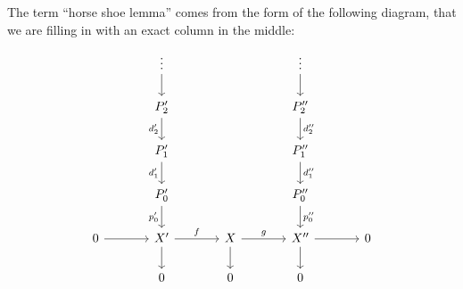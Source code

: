 \begin{remark*}
  The term \enquote{horse shoe lemma} comes from the form of the following diagram, that we are filling in with an exact column in the middle:
  \[
    \begin{tikzcd}[ampersand replacement = \&, column sep = large]
          {}
      \&  \vdots
          \arrow{d}
      \&  {}
      \&  \vdots
          \arrow{d}
      \&  {}
      \\
          {}
      \&  P'_2
          \arrow{d}[left]{d'_2}
      \&  {}
      \&  P''_2
          \arrow{d}[right]{d''_2}
      \&  {}
      \\
          {}
      \&  P'_1
          \arrow{d}[left]{d'_1}
      \&  {}
      \&  P''_1
          \arrow{d}[right]{d''_1}
      \&  {}
      \\
          {}
      \&  P'_0
          \arrow{d}[left]{p'_0}
      \&  {}
      \&  P''_0
          \arrow{d}[right]{p''_0}
      \&  {}
      \\
          0
          \arrow{r}
      \&  X'
          \arrow{r}[above]{f}
          \arrow{d}
      \&  X
          \arrow{r}[above]{g}
          \arrow{d}
      \&  X''
          \arrow{r}
          \arrow{d}
      \&  0
      \\
          {}
      \&  0
      \&  0
      \&  0
      \&  {}
    \end{tikzcd}
  \]
\end{remark*}





